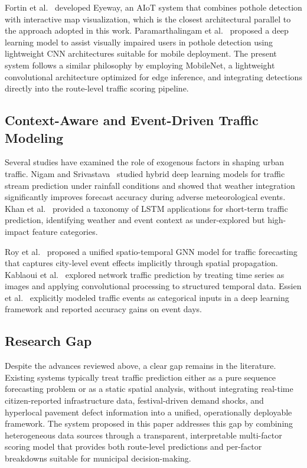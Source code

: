 \documentclass[conference]{IEEEtran}
\begin{document}
Fortin et al.~\cite{b4} developed Eyeway, an AIoT system that combines pothole detection with interactive map visualization, which is the closest architectural parallel to the approach adopted in this work. Paramarthalingam et al.~\cite{b5} proposed a deep learning model to assist visually impaired users in pothole detection using lightweight CNN architectures suitable for mobile deployment. The present system follows a similar philosophy by employing MobileNet, a lightweight convolutional architecture optimized for edge inference, and integrating detections directly into the route-level traffic scoring pipeline.

\subsection{Context-Aware and Event-Driven Traffic Modeling}

Several studies have examined the role of exogenous factors in shaping urban traffic. Nigam and Srivastava~\cite{b9} studied hybrid deep learning models for traffic stream prediction under rainfall conditions and showed that weather integration significantly improves forecast accuracy during adverse meteorological events. Khan et al.~\cite{b7} provided a taxonomy of LSTM applications for short-term traffic prediction, identifying weather and event context as under-explored but high-impact feature categories.

Roy et al.~\cite{b15} proposed a unified spatio-temporal GNN model for traffic forecasting that captures city-level event effects implicitly through spatial propagation. Kablaoui et al.~\cite{b6} explored network traffic prediction by treating time series as images and applying convolutional processing to structured temporal data. Essien et al.~\cite{b14} explicitly modeled traffic events as categorical inputs in a deep learning framework and reported accuracy gains on event days.

\subsection{Research Gap}

Despite the advances reviewed above, a clear gap remains in the literature. Existing systems typically treat traffic prediction either as a pure sequence forecasting problem or as a static spatial analysis, without integrating real-time citizen-reported infrastructure data, festival-driven demand shocks, and hyperlocal pavement defect information into a unified, operationally deployable framework. The system proposed in this paper addresses this gap by combining heterogeneous data sources through a transparent, interpretable multi-factor scoring model that provides both route-level predictions and per-factor breakdowns suitable for municipal decision-making.
\end{document}
